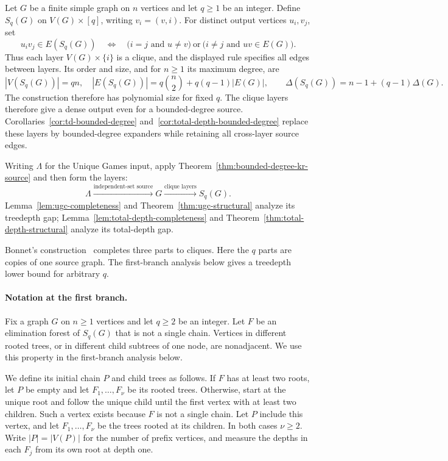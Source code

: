 Let $G$ be a finite simple graph on $n$ vertices and let $q\geq1$
be an integer. Define $S_q(G)$ on $V(G)\times[q]$, writing
$v_i=(v,i)$. For distinct output vertices $u_i,v_j$, set
\[
 u_iv_j\in E(S_q(G))
 \quad\Longleftrightarrow\quad
 \bigl(i=j\text{ and }u\ne v\bigr)
 \ \text{or}\ \bigl(i\ne j\text{ and }uv\in E(G)\bigr).
\]
Thus each layer $V(G)\times\{i\}$ is a clique, and the displayed rule
specifies all edges between layers. Its order and size, and for $n\geq1$ its maximum degree, are
\[
 |V(S_q(G))|=qn,\quad
 |E(S_q(G))|=q\binom n2+q(q-1)|E(G)|,\qquad \Delta(S_q(G))=n-1+(q-1)\Delta(G).
\]
The construction therefore has polynomial size for fixed $q$.
The clique layers therefore give a dense output even for a
bounded-degree source. Corollaries~\ref{cor:td-bounded-degree}
and~\ref{cor:total-depth-bounded-degree} replace these layers by
bounded-degree expanders while retaining all cross-layer source edges.

Writing $\Lambda$ for the Unique Games input, apply
Theorem~\ref{thm:bounded-degree-kr-source} and then form the layers:
\[
 \Lambda\xrightarrow{\text{independent-set source}}G
 \xrightarrow{\text{clique layers}}S_q(G).
\]
Lemma~\ref{lem:ugc-completeness} and
Theorem~\ref{thm:ugc-structural} analyze its treedepth gap;
Lemma~\ref{lem:total-depth-completeness} and
Theorem~\ref{thm:total-depth-structural} analyze its total-depth gap.

Bonnet's construction~\cite[Section~3.1]{BonnetTreewidth} completes
three parts to cliques. Here the $q$ parts are copies of one source
graph. The first-branch analysis below gives a treedepth lower bound
for arbitrary $q$.

\paragraph{Notation at the first branch.}
\label{subsec:ugc-branch-notation}

Fix a graph $G$ on $n\geq1$ vertices and let $q\geq2$ be an integer. Let $F$
be an elimination forest of $S_q(G)$ that is not a single chain.
Vertices in different rooted trees, or in different child subtrees
of one node, are nonadjacent. We use this property in the first-branch
analysis below.

We define its initial chain $P$ and child trees as follows. If $F$
has at least two roots, let $P$ be empty and let $F_1,\ldots,F_\nu$ be
its rooted trees. Otherwise, start at the unique root and follow the
unique child until the first vertex with at least two children.
Such a vertex exists because $F$ is not a single chain. Let $P$
include this vertex, and let $F_1,\ldots,F_\nu$ be the trees rooted at
its children. In both cases $\nu\geq2$. Write $|P|=|V(P)|$ for the
number of prefix vertices, and measure the depths in each $F_j$
from its own root at depth one.

